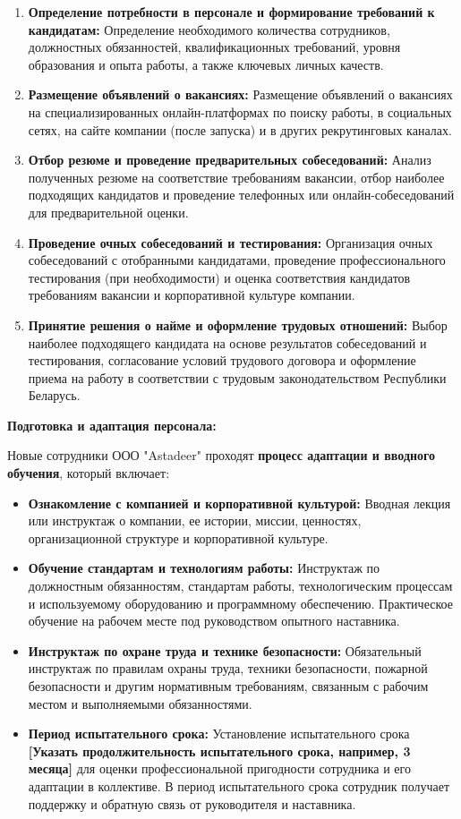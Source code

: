     \begin{enumerate}
        \item \textbf{Определение потребности в персонале и формирование требований к кандидатам:}  Определение необходимого количества сотрудников, должностных обязанностей, квалификационных требований, уровня образования и опыта работы, а также ключевых личных качеств.
        \item \textbf{Размещение объявлений о вакансиях:}  Размещение объявлений о вакансиях на специализированных онлайн-платформах по поиску работы, в социальных сетях, на сайте компании (после запуска) и в других рекрутинговых каналах.
        \item \textbf{Отбор резюме и проведение предварительных собеседований:}  Анализ полученных резюме на соответствие требованиям вакансии, отбор наиболее подходящих кандидатов и проведение телефонных или онлайн-собеседований для предварительной оценки.
        \item \textbf{Проведение очных собеседований и тестирования:}  Организация очных собеседований с отобранными кандидатами, проведение профессионального тестирования (при необходимости) и оценка соответствия кандидатов требованиям вакансии и корпоративной культуре компании.
        \item \textbf{Принятие решения о найме и оформление трудовых отношений:}  Выбор наиболее подходящего кандидата на основе результатов собеседований и тестирования, согласование условий трудового договора и оформление приема на работу в соответствии с трудовым законодательством Республики Беларусь.
    \end{enumerate}

    \textbf{Подготовка и адаптация персонала:}

    Новые сотрудники ООО "Astadeer" проходят \textbf{процесс адаптации и вводного обучения}, который включает:

    \begin{itemize}
        \item \textbf{Ознакомление с компанией и корпоративной культурой:}  Вводная лекция или инструктаж о компании, ее истории, миссии, ценностях, организационной структуре и корпоративной культуре.
        \item \textbf{Обучение стандартам и технологиям работы:}  Инструктаж по должностным обязанностям, стандартам работы, технологическим процессам и используемому оборудованию и программному обеспечению.  Практическое обучение на рабочем месте под руководством опытного наставника.
        \item \textbf{Инструктаж по охране труда и технике безопасности:}  Обязательный инструктаж по правилам охраны труда, техники безопасности, пожарной безопасности и другим нормативным требованиям, связанным с рабочим местом и выполняемыми обязанностями.
        \item \textbf{Период испытательного срока:}  Установление испытательного срока \textbf{[Указать продолжительность испытательного срока, например, 3 месяца]} для оценки профессиональной пригодности сотрудника и его адаптации в коллективе.  В период испытательного срока сотрудник получает поддержку и обратную связь от руководителя и наставника.
    \end{itemize}


